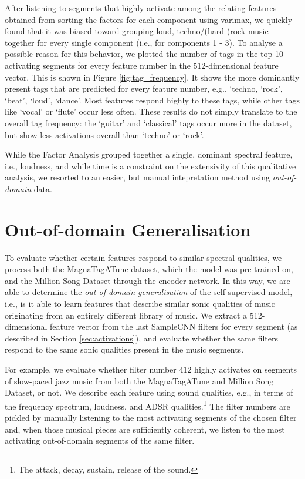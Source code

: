 After listening to segments that highly activate among the relating features obtained from sorting the factors for each component using varimax, we quickly found that it was biased toward grouping loud, techno/(hard-)rock music together for every single component (i.e., for components 1 - 3). To analyse a possible reason for this behavior, we plotted the number of tags in the top-10 activating segments for every feature number in the 512-dimensional feature vector. This is shown in Figure \ref{fig:tag_frequency}. It shows the more dominantly present tags that are predicted for every feature number, e.g., `techno, `rock', `beat', `loud', `dance'. Most features respond highly to these tags, while other tags like `vocal' or `flute' occur less often. These results do not simply translate to the overall tag frequency: the `guitar' and `classical' tags occur more in the dataset, but show less activations overall than `techno' or `rock'.

While the Factor Analysis grouped together a single, dominant spectral feature, i.e., loudness, and while time is a constraint on the extensivity of this qualitative analysis, we resorted to an easier, but manual intepretation method using \textit{out-of-domain} data.


\section{Out-of-domain Generalisation}\label{sec:manual_interpretations}
To evaluate whether certain features respond to similar spectral qualities, we process both the MagnaTagATune dataset, which the model was pre-trained on, and the Million Song Dataset through the encoder network. In this way, we are able to determine the \textit{out-of-domain generalisation} of the self-supervised model, i.e., is it able to learn features that describe similar sonic qualities of music originating from an entirely different library of music. We extract a 512-dimensional feature vector from the last SampleCNN filters for every segment (as described in Section \ref{sec:activations}), and evaluate whether the same filters respond to the same sonic qualities present in the music segments.

For example, we evaluate whether filter number $412$ highly activates on segments of slow-paced jazz music from both the MagnaTagATune and Million Song Dataset, or not. We describe each feature using sound qualities, e.g., in terms of the frequency spectrum, loudness, and ADSR qualities.\footnote{The attack, decay, sustain, release of the sound.} The filter numbers are pickled by manually listening to the most activating segments of the chosen filter and, when those musical pieces are sufficiently coherent, we listen to the most activating out-of-domain segments of the same filter.

